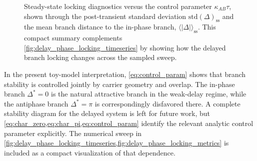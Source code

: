 \documentclass[11pt]{article}
\begin{document}
        \begin{figure}[t]
            \centering
            \caption{Steady-state locking diagnostics versus the control parameter \(\kappa_{AB}\tau\), shown through the post-transient standard deviation \(\mathrm{std}(\Delta)_{\mathrm{ss}}\) and the mean branch distance to the in-phase branch, \(\langle |\Delta| \rangle_{\mathrm{ss}}\). This compact summary complements \cref{fig:delay_phase_locking_timeseries} by showing how the delayed branch locking changes across the sampled sweep.}
            \label{fig:delay_phase_locking_metrics}
        \end{figure}

        In the present toy-model interpretation, \cref{eq:control_param} shows that branch stability is controlled jointly by carrier geometry and overlap. The in-phase branch \(\Delta^\ast=0\) is the natural attractive branch in the weak-delay regime, while the antiphase branch \(\Delta^\ast=\pi\) is correspondingly disfavored there. A complete stability diagram for the delayed system is left for future work, but \cref{eq:char_zero,eq:char_pi,eq:control_param} identify the relevant analytic control parameter explicitly. The numerical sweep in \cref{fig:delay_phase_locking_timeseries,fig:delay_phase_locking_metrics} is included as a compact visualization of that dependence.
\end{document}
